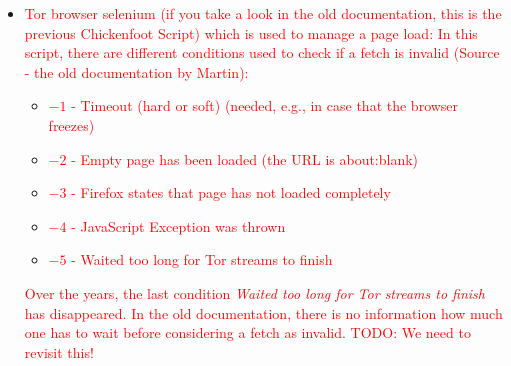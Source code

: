 \vspace{-5mm}
\begin{itemize}
  \item \textcolor{red}{Tor browser selenium (if you take a look in the old documentation, this is the previous Chickenfoot Script) which is used to manage a page load: In this script, there are different conditions used to check if a fetch is invalid (Source - the old documentation by Martin):}
  \begin{itemize}
    \item \textcolor{red}{$-1$ - Timeout (hard or soft) (needed, e.g., in case that the browser freezes)}
    \item \textcolor{red}{$-2$ - Empty page has been loaded (the \ac{URL} is about:blank)}
    \item \textcolor{red}{$-3$ - Firefox states that page has not loaded completely}
    \item \textcolor{red}{$-4$ - JavaScript Exception was thrown}
    \item \textcolor{red}{$-5$ - Waited too long for Tor streams to finish}
  \end{itemize}
\textcolor{red}{Over the years, the last condition \emph{Waited too long for Tor streams to finish} has disappeared. In the old documentation, there is no information how much one has to wait before considering a fetch as invalid. TODO: We need to revisit this!}

\end{itemize}
